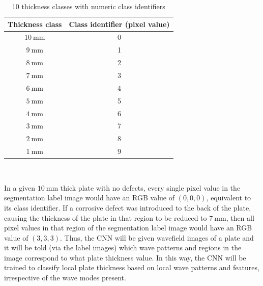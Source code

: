 \documentclass[11pt,letterpaper]{article}
\begin{document}
		\begin{table}[H]
		\centering
		\captionsetup{margin=1cm}
		\caption{10 thickness classes with numeric class identifiers}
		\renewcommand{\arraystretch}{1.5}
		\begin{tabular}{| c | c |}
		\hline
	 	\textbf{Thickness class} & \textbf{Class identifier (pixel value)} \\ \hline \hline
	 	$10\ \si{\milli\metre}$ & 0 \\ \hline
	 	$9\ \si{\milli\metre}$ & 1 \\ \hline
	 	$8\ \si{\milli\metre}$ & 2 \\ \hline
	 	$7\ \si{\milli\metre}$ & 3 \\ \hline
	 	$6\ \si{\milli\metre}$ & 4 \\ \hline
	 	$5\ \si{\milli\metre}$ & 5 \\ \hline
	 	$4\ \si{\milli\metre}$ & 6 \\ \hline
	 	$3\ \si{\milli\metre}$ & 7 \\ \hline
	 	$2\ \si{\milli\metre}$ & 8 \\ \hline
	 	$1\ \si{\milli\metre}$ & 9 \\ \hline
		\end{tabular}\\
		\label{table:classes}
		\end{table}
		In a given $10\ \si{\milli\metre}$ thick plate with no defects, every single pixel value in the segmentation label image would have an RGB value of $(0,0,0)$, equivalent to its class identifier. If a corrosive defect was introduced to the back of the plate, causing the thickness of the plate in that region to be reduced to $7\ \si{\milli\metre}$, then all pixel values in that region of the segmentation label image would have an RGB value of $(3,3,3)$. Thus, the CNN will be given wavefield images of a plate and it will be told (via the label images) which wave patterns and regions in the image correspond to what plate thickness value. In this way, the CNN will be trained to classify local plate thickness based on local wave patterns and features, irrespective of the wave modes present.
\end{document}
